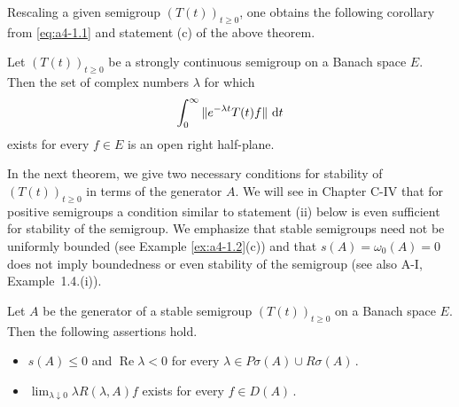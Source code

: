 
Rescaling a given semigroup $ (T(t))_{t \geq 0} $, one obtains the following corollary from \eqref{eq:a4-1.1} and statement (c) of the above theorem.

\begin{corollary} \label{cor:a4-1.12} 
Let $ (T(t))_{t \geq 0} $ be a strongly continuous semigroup on a Banach space $ E $. Then the set of complex numbers $ \lambda $ for which
\[
\int_{0}^{\infty} \|e^{-\lambda t} T (t) f \| \,\mathop{}\!\mathrm{d}{t} 
\]
exists for every $ f \in E $  is an open right half-plane.
\end{corollary}


In the next theorem, we give two necessary conditions for stability of $ (T(t))_{t \geq 0} $ in terms of the generator $ A $. We will see in Chapter C-IV that for positive semigroups a condition similar to statement (ii) below is even sufficient for stability of the semigroup. 
We emphasize that stable semigroups need not be uniformly bounded (see Example \ref{ex:a4-1.2}(c)) and that $ s(A) = \omega_0(A) = 0 $ does not imply boundedness or even stability of the semigroup (see also A-I, Example~1.4.(i)).

\begin{theorem} \label{thm:a4-1.13} Let $ A $ be the generator of a stable semigroup $ (T(t))_{t \geq 0} $ on a Banach space $ E $. Then the following assertions hold.

\begin{itemize}[(i)]
    \item 
    $ s(A) \leq 0 $ and $ \operatorname{Re} \lambda < 0 $ for every $ \lambda \in P\sigma (A) \cup R\sigma(A) $\,.
    
    \item 
    $ \lim_{\lambda \downarrow 0} \lambda R(\lambda, A) f $ exists for every $ f \in D(A) $\,.
\end{itemize}
\end{theorem}

